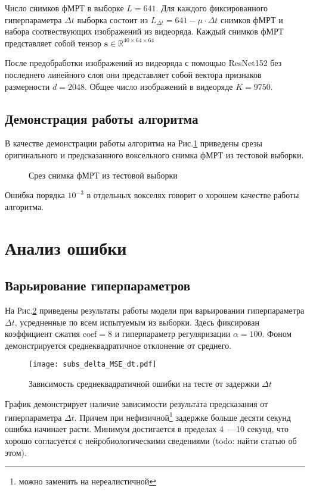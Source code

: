 \documentclass[12pt,twoside]{article}
\begin{document}
Число снимков фМРТ в выборке $L = 641$.  
Для каждого фиксированного гиперпараметра $\Delta t$ выборка состоит из $L_{\Delta t} = 641-\mu \cdot \Delta t$  снимков фМРТ и набора соотвествующих изображений из видеоряда. 
Каждый снимков фМРТ представляет собой тензор $\bm{s} \in \mathbb{R}^{{40} \times {64} \times {64}}$

После предобработки изображений из видеоряда с помощью ResNet152 без последнего линейного слоя они представляет собой вектора признаков размерности $d = 2048$. 
Общее число изображений в видеоряде $K = 9750$.

\subsection{Демонстрация работы алгоритма}
В качестве демонстрации работы алгоритма на Рис.\ref{fig:5} приведены срезы оригинального и предсказанного воксельного снимка фМРТ из тестовой выборки.
\begin{figure}[h!]
    \centering
    \hfill
    \hfill
    \caption{Срез снимка фМРТ из тестовой выборки}
    \label{fig:5}
\end{figure}
Ошибка порядка $10^{-3}$ в отдельных вокселях говорит о хорошем качестве работы алгоритма.

\section{Анализ ошибки}
\subsection{Варьирование гиперпараметров}
На Рис.\ref{MSE_dt_main} приведены результаты работы модели при варьировании гиперпараметра $\Delta t$, усредненные по всем испытуемым из выборки. Здесь фиксирован коэффициент сжатия $\mathrm{coef} = 8$ и гиперпараметр регуляризации $\alpha = 100$. Фоном демонстрируется среднеквадратичное отклонение от среднего.
\begin{figure}[h!]
    \centering
    \texttt{[image: subs\_delta\_MSE\_dt.pdf]}
    \caption{Зависимость среднеквадратичной ошибки на тесте от задержки ${\Delta t}$}
    \label{MSE_dt_main}
\end{figure}
График демонстрирует наличие зависимости результата предсказания от гиперпараметра $\Delta t$. 
Причем при нефизичной\footnote{ можно заменить на нереалистичной} задержке больше десяти секунд ошибка начинает расти. 
Минимум достигается в пределах 4~---10 секунд, что хорошо согласуется с нейробиологическими сведениями (todo: найти статью об этом).
\end{document}
